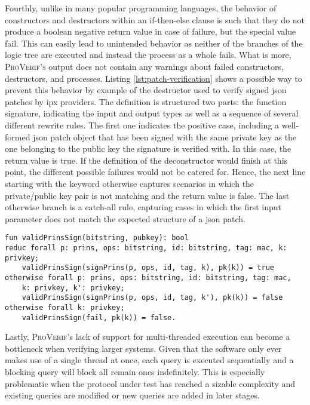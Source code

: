 Fourthly, unlike in many popular programming languages, the behavior of constructors and destructors within an if-then-else clause is such that they do not produce a boolean negative return value in case of failure, but the special value {\sffamily fail}.
This can easily lead to unintended behavior as neither of the branches of the logic tree are executed and instead the process as a whole fails.
What is more, \textsc{ProVerif's} output does not contain any warnings about failed constructors, destructors, and processes.
Listing \ref{lst:patch-verification} shows a possible way to prevent this behavior by example of the destructor used to verify signed \gls{json} patches by \gls{ipx} providers.
The definition is structured two parts: the function signature, indicating the input and output types as well as a sequence of several different rewrite rules.
The first one indicates the positive case, including a well-formed \gls{json} patch object that has been signed with the same private key as the one belonging to the public key the signature is verified with.
In this case, the return value is \textsf{true}.
If the definition of the deconstructor would finish at this point, the different possible failures would not be catered for.
Hence, the next line starting with the keyword {\sffamily otherwise} captures scenarios in which the private/public key pair is not matching and the return value is \textsf{false}.
The last {\sffamily otherwise} branch is a catch-all rule, capturing cases in which the first input parameter does not match the expected structure of a \gls{json} patch.

\begin{lstlisting}[caption={Custom channel declarations},label={lst:patch-verification},firstnumber=23]
fun validPrinsSign(bitstring, pubkey): bool
reduc forall p: prins, ops: bitstring, id: bitstring, tag: mac, k: privkey;
    validPrinsSign(signPrins(p, ops, id, tag, k), pk(k)) = true
otherwise forall p: prins, ops: bitstring, id: bitstring, tag: mac,
    k: privkey, k': privkey;
    validPrinsSign(signPrins(p, ops, id, tag, k'), pk(k)) = false
otherwise forall k: privkey;
    validPrinsSign(fail, pk(k)) = false.
\end{lstlisting}


Lastly, \textsc{ProVerif}'s lack of support for multi-threaded execution can become a bottleneck when verifying larger systems.
Given that the software only ever makes use of a single thread at once, each query is executed sequentially and a blocking query will block all remain ones indefinitely.
This is especially problematic when the protocol under test has reached a sizable complexity and existing queries are modified or new queries are added in later stages.

